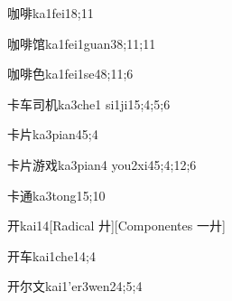 
\begin{verbete}{咖啡}{ka1fei1}{8;11}
\end{verbete}

\begin{verbete}{咖啡馆}{ka1fei1guan3}{8;11;11}
\end{verbete}

\begin{verbete}{咖啡色}{ka1fei1se4}{8;11;6}
\end{verbete}

\begin{verbete}{卡车司机}{ka3che1 si1ji1}{5;4;5;6}
\end{verbete}

\begin{verbete}{卡片}{ka3pian4}{5;4}
\end{verbete}

\begin{verbete}{卡片游戏}{ka3pian4 you2xi4}{5;4;12;6}
\end{verbete}

\begin{verbete}{卡通}{ka3tong1}{5;10}
\end{verbete}

\begin{verbete}{开}{kai1}{4}[Radical 廾][Componentes 一廾]
\end{verbete}

\begin{verbete}{开车}{kai1che1}{4;4}
\end{verbete}

\begin{verbete}{开尔文}{kai1'er3wen2}{4;5;4}
\end{verbete}

